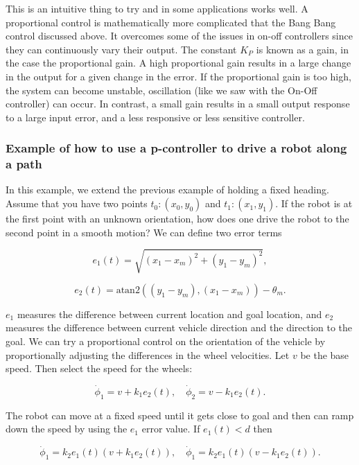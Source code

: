 This is an intuitive thing to try and in some applications works well. A
proportional control is mathematically more complicated that the Bang
Bang control discussed above. It overcomes some of the issues in on-off
controllers since they can continuously vary their output. The constant
\(K_P\) is known as a gain, in the case the proportional gain. A high
proportional gain results in a large change in the output for a given
change in the error. If the proportional gain is too high, the system
can become unstable, oscillation (like we saw with the On-Off
controller) can occur. In contrast, a small gain results in a small
output response to a large input error, and a less responsive or less
sensitive controller.

\hypertarget{example-of-how-to-use-a-p-controller-to-drive-a-robot-along-a-path}{%
\subsubsection{Example of how to use a p-controller to drive a robot
along a
path}\label{example-of-how-to-use-a-p-controller-to-drive-a-robot-along-a-path}}

In this example, we extend the previous example of holding a fixed
heading. Assume that you have two points \(t_0: (x_0,y_0)\) and
\(t_1: (x_1, y_1)\). If the robot is at the first point with an unknown
orientation, how does one drive the robot to the second point in a
smooth motion? We can define two error terms

\[e_1(t) = \sqrt{(x_1 - x_m)^2 +  (y_1 - y_m)^2},\]

\[e_2(t) = \mbox{atan2}((y_1 - y_m), (x_1 - x_m)) - \theta_m .\]

\(e_1\) measures the difference between current location and goal
location, and \(e_2\) measures the difference between current vehicle
direction and the direction to the goal. We can try a proportional
control on the orientation of the vehicle by proportionally adjusting
the differences in the wheel velocities. Let \(v\) be the base speed.
Then select the speed for the wheels:

\[\dot{\phi}_1 = v + k_1 e_2(t), \quad \dot{\phi}_2 = v - k_1 e_2(t).\]

The robot can move at a fixed speed until it gets close to goal and then
can ramp down the speed by using the \(e_1\) error value. If
\(e_1(t) < d\) then

\[\dot{\phi}_1 = k_2e_1(t)(v + k_1 e_2(t)) , \quad \dot{\phi}_1 = k_2e_1(t)(v - k_1 e_2(t)).\]


